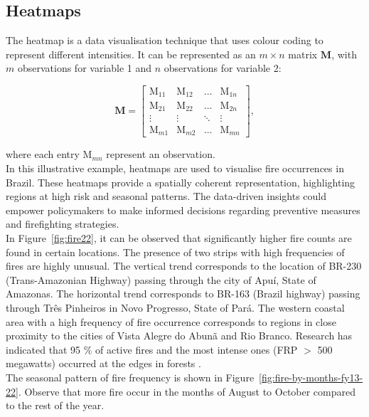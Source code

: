 \documentclass{article}\usepackage[]{graphicx}\usepackage[]{xcolor}
\numberwithin{equation}{section}
\begin{document}
\subsection{Heatmaps}
The heatmap is a data visualisation technique that uses colour coding to represent different intensities. It can be represented as an $m \times n$ matrix $\mathbf{M}$, with $m$ observations for variable 1 and $n$ observations for variable 2:

$$\mathbf{M} =
\left[
\begin{array}{cccc}
    \mathrm{M}_{11} & \mathrm{M}_{12} & \ldots & \mathrm{M}_{1n} \\  
    \mathrm{M}_{21} & \mathrm{M}_{22} & \ldots & \mathrm{M}_{2n} \\  
    \vdots & \vdots & \ddots & \vdots \\  
    \mathrm{M}_{m1} & \mathrm{M}_{m2} & \ldots & \mathrm{M}_{mn}
\end{array}
\right],
$$

\noindent
where each entry $\mathrm{M}_{mn}$ represent an observation.\\

\noindent
In this illustrative example, heatmaps are used to visualise fire occurrences in Brazil. These heatmaps provide a spatially coherent representation, highlighting regions at high risk and seasonal patterns. The data-driven insights could empower policymakers to make informed decisions regarding preventive measures and firefighting strategies.\\

\noindent
In Figure~\ref{fig:fire22}, it can be observed that significantly higher fire counts are found in certain locations. The presence of two strips with high frequencies of fires are highly unusual. The vertical trend corresponds to the location of BR-230 (Trans-Amazonian Highway) passing through the city of Apuí, State of Amazonas. The horizontal trend corresponds to BR-163 (Brazil highway) passing through Três Pinheiros in Novo Progresso, State of Pará. The western coastal area with a high frequency of fire occurrence corresponds to regions in close proximity to the cities of Vista Alegre do Abunã and Rio Branco. Research has indicated that 95 \% of active fires and the most intense ones (FRP $>$ 500 megawatts) occurred at the edges in forests \cite{forest}.\\

\noindent
The seasonal pattern of fire frequency is shown in Figure~\ref{fig:fire-by-months-fy13-22}. Observe that more fire occur in the months of August to October compared to the rest of the year.
\end{document}
